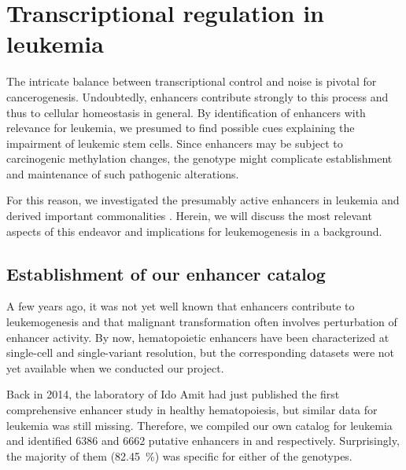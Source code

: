 \chapter{Transcriptional regulation in leukemia}
\label{chap:d:enhancers:mechanism}
\minitoc

The intricate balance between transcriptional control and noise is pivotal for cancerogenesis. Undoubtedly, enhancers contribute strongly to this process and thus to cellular homeostasis in general. By identification of enhancers with relevance for leukemia, we presumed to find possible cues explaining the impairment of \dnmtchip leukemic stem cells. Since enhancers may be subject to carcinogenic methylation changes\cite{Rasmussen2015,Aran2013,Aran2014}, the \dnmtchip genotype might complicate establishment and maintenance of such pathogenic alterations. 

For this reason, we investigated the presumably active enhancers in \mllafnine leukemia and derived important commonalities . Herein, we will discuss the most relevant aspects of this endeavor and implications for leukemogenesis in a \dnmtchip background. 

\section{Establishment of our \mllafnine enhancer catalog}
\label{chap:d:enhancers:mechanism:catalog}

A few years ago, it was not yet well known that enhancers contribute to leukemogenesis and that malignant transformation often involves perturbation of enhancer activity. By now, hematopoietic enhancers have been characterized at single-cell and single-variant resolution\cite{Corces2016,Ulirsch2019}, but the corresponding datasets were not yet available when we conducted our project. 

Back in 2014, the laboratory of Ido Amit had just published the first comprehensive enhancer study in healthy hematopoiesis\cite{Lara-Astiaso2014}, but similar data for leukemia was still missing. Therefore, we compiled our own catalog for \mllafnine leukemia and identified \num{6386} and \num{6662} putative enhancers in \dnmtwt and \dnmtchip respectively. Surprisingly, the majority of them (\SI{82.45}{\percent}) was specific for either of the genotypes.
 
